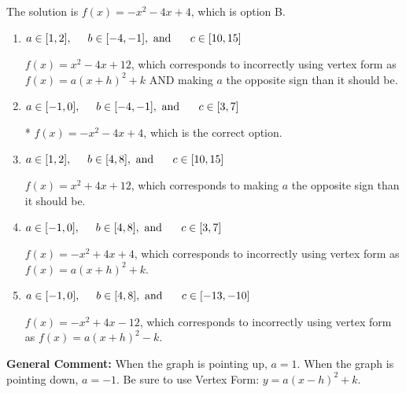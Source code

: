 \documentclass{extbook}[14pt]
\begin{document}
\begin{enumerate}
{The solution is \( f(x) = -x^{2} -4 x + 4 \), which is option B.\begin{enumerate}[label=\Alph*.]
\item \( a \in [1, 2], \hspace*{5mm} b \in [-4, -1], \text{ and } \hspace*{5mm} c \in [10, 15] \)

$f(x)=x^{2} -4 x + 12$, which corresponds to incorrectly using vertex form as $f(x) = a(x+h)^2+k$ AND making $a$ the opposite sign than it should be.
\item \( a \in [-1, 0], \hspace*{5mm} b \in [-4, -1], \text{ and } \hspace*{5mm} c \in [3, 7] \)

* $f(x)=-x^{2} -4 x + 4$, which is the correct option.
\item \( a \in [1, 2], \hspace*{5mm} b \in [4, 8], \text{ and } \hspace*{5mm} c \in [10, 15] \)

$f(x)=x^{2} +4 x + 12$, which corresponds to making $a$ the opposite sign than it should be.
\item \( a \in [-1, 0], \hspace*{5mm} b \in [4, 8], \text{ and } \hspace*{5mm} c \in [3, 7] \)

$f(x)=-x^{2} +4 x + 4$, which corresponds to incorrectly using vertex form as $f(x) = a(x+h)^2+k$.
\item \( a \in [-1, 0], \hspace*{5mm} b \in [4, 8], \text{ and } \hspace*{5mm} c \in [-13, -10] \)

$f(x)=-x^{2} +4 x -12$, which corresponds to incorrectly using vertex form as $f(x) = a(x+h)^2 - k$.
\end{enumerate}

\textbf{General Comment:} When the graph is pointing up, $a=1$. When the graph is pointing down, $a=-1$. Be sure to use Vertex Form: $y = a(x-h)^2+k$.
}
\end{enumerate}
\end{document}
